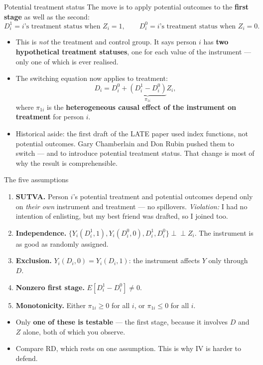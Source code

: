 \documentclass[
  11pt,
  ignorenonframetext,
  aspectratio=169,
]{beamer}
\providecommand{\tightlist}{%
  \setlength{\itemsep}{0pt}\setlength{\parskip}{0pt}}
\newcommand{\indep}{\perp\!\!\!\perp}
\begin{document}
\begin{frame}{Potential treatment status}
\protect{}\label{potential-treatment-status}
The move is to apply potential outcomes to the \textbf{first stage} as
well as the second: \[
D_i^{1} = i\text{'s treatment status when } Z_i = 1,
\qquad
D_i^{0} = i\text{'s treatment status when } Z_i = 0 .
\]

\begin{itemize}
\tightlist
\item
  This is \emph{not} the treatment and control group. It says person
  \(i\) has \textbf{two hypothetical treatment statuses}, one for each
  value of the instrument --- only one of which is ever realised.
\item
  The switching equation now applies to treatment: \[
  D_i = D_i^{0} + \underbrace{(D_i^{1} - D_i^{0})}_{\pi_{1i}} Z_i ,
  \] where \(\pi_{1i}\) is the \textbf{heterogeneous causal effect of
  the instrument on treatment} for person \(i\).
\item
  Historical aside: the first draft of the LATE paper used index
  functions, not potential outcomes. Gary Chamberlain and Don Rubin
  pushed them to switch --- and to introduce potential treatment status.
  That change is most of why the result is comprehensible.
\end{itemize}
\end{frame}

\begin{frame}{The five assumptions}
\protect{}\label{the-five-assumptions}
\begin{enumerate}
\tightlist
\item
  \textbf{SUTVA.} Person \(i\)'s potential treatment and potential
  outcomes depend only on \emph{their own} instrument and treatment ---
  no spillovers. \emph{Violation:} I had no intention of enlisting, but
  my best friend was drafted, so I joined too.
\item
  \textbf{Independence.}
  \(\{Y_i(D^1_i,1), Y_i(D^0_i,0), D^1_i, D^0_i\} \indep Z_i\). The
  instrument is as good as randomly assigned.
\item
  \textbf{Exclusion.} \(Y_i(D_i, 0) = Y_i(D_i, 1)\): the instrument
  affects \(Y\) only through \(D\).
\item
  \textbf{Nonzero first stage.} \(E[D^1_i - D^0_i] \neq 0\).
\item
  \textbf{Monotonicity.} Either \(\pi_{1i} \geq 0\) for all \(i\), or
  \(\pi_{1i} \leq 0\) for all \(i\).
\end{enumerate}

\vspace{0.4em}

\begin{itemize}
\tightlist
\item
  Only \textbf{one of these is testable} --- the first stage, because it
  involves \(D\) and \(Z\) alone, both of which you observe.
\item
  Compare RD, which rests on one assumption. This is why IV is harder to
  defend.
\end{itemize}
\end{frame}
\end{document}

